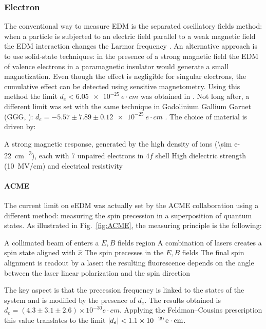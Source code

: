 \begin{refsection}
        \subsubsection{Electron}
            The conventional way to measure EDM is the separated oscillatory fields method: when a particle is subjected to an electric field parallel to a weak magnetic field the EDM interaction changes the Larmor frequency \cite{ramsey}.
            An alternative approach is to use solid-state techniques:
            in the presence of a strong magnetic field the EDM of valence electrons in a paramagnetic insulator would generate a small magnetization.
            Even though the effect is negligible for singular electrons, the cumulative effect can be detected using sensitive magnetometry.
            Using this method the limit $d_e<\SI{6.05e-25}{e\cdot cm}$ was obtained in  \cite{eEDM:EuBaTiO}.
            Not long after, a different limit was set with the same technique in  Gadolinium Gallium Garnet (GGG, ): $d_e=-5.57\pm7.89\pm\SI{0.12e-25}{e\cdot cm}$ \cite{eEDM:GGG}.
            The choice of material is driven by:
            \begin{outline}
                \1 A strong magnetic response, generated by the high density of  ions (\SI{\sim e-22}{cm^{-3}}), each with 7 unpaired electrons in $4f$ shell
                \1 High dielectric strength (\SI{10}{MV/cm}) and electrical resistivity
            \end{outline}
            
            \paragraph{ACME}
            The current limit on eEDM was actually set by the ACME collaboration \cite{eEDM:ACME} using a different method: measuring the spin precession in a superposition of quantum states.
            As illustrated in Fig.~\ref{fig:ACME}, the measuring principle is the following:
            \begin{outline}
                \1 A collimated beam of  enters a $E,B$ fields region
                \1 A combination of lasers creates a spin state aligned with $\hat{x}$
                \1 The spin precesses in the $E,B$ fields
                \1 The final spin alignment is readout by a laser: the resulting fluorescence depends on the angle between the laser linear polarization and the spin direction 
            \end{outline}
            The key aspect is that the precession frequency is linked to the states of the system and is modified by the presence of $d_e$.
            The results obtained is $d_e=(4.3\pm3.1\pm2.6)\times 10^{-30}\si{e\cdot cm}$.
            Applying the Feldman–Cousins prescription this value translates to the limit $\abs{d_e}<\SI{1.1e-29}{e\cdot cm}$.


\end{refsection}
